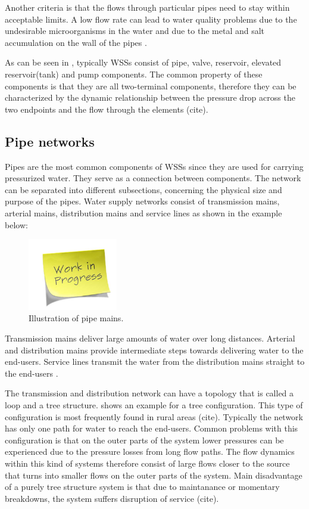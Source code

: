 Another criteria is that the flows through particular pipes need to stay within acceptable limits. A low flow rate can lead to water quality problems due to the undesirable microorganisms in the water and due to the metal and salt accumulation on the wall of the pipes \cite{walski2003advanced}. 

As can be seen in , typically WSSs consist of pipe, valve, reservoir, elevated reservoir(tank) and pump components. The common property of these components is that they are all two-terminal components, therefore they can be characterized by the dynamic relationship between the pressure drop across the two endpoints and the flow through the elements (cite). 

\subsection{Pipe networks}
\label{pipe_networks}

Pipes are the most common components of WSSs since they are used for carrying pressurized water. They serve as a connection between components. The network can be separated into different subsections, concerning the physical size and purpose of the pipes. Water supply networks consist of transmission mains, arterial mains, distribution mains and service lines as shown in the example below: 

\begin{figure}[H]
\centering
\includegraphics[width=0.35\textwidth]{report/pictures/missingfigure}
\caption{Illustration of pipe mains.}
\label{fig:pipemain_example}
\end{figure}

Transmission mains deliver large amounts of water over long distances. Arterial and distribution mains provide intermediate steps towards delivering water to the end-users. Service lines transmit the water from the distribution mains straight to the end-users \cite{grigg2012water}.

The transmission and distribution network can have a topology that is called a loop and a tree structure.   shows an example for a tree configuration. This type of configuration is most frequently found in rural areas (cite). Typically the network has only one path for water to reach the end-users. Common problems with this configuration is that on the outer parts of the system lower pressures can be experienced due to the pressure losses from long flow paths. The flow dynamics within this kind of systems therefore consist of large flows closer to the source that turns into smaller flows on the outer parts of the system. Main disadvantage of a purely tree structure system is that due to maintanance or momentary breakdowns, the system suffers disruption of service (cite). 

